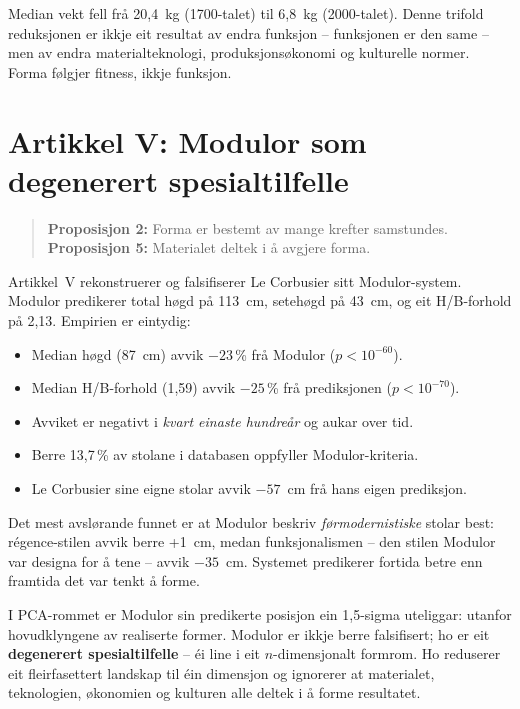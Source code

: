 \documentclass[12pt,a4paper,oneside]{report}
\begin{document}
Median vekt fell frå 20,4~kg (1700-talet) til 6,8~kg (2000-talet). Denne trifold reduksjonen er ikkje eit resultat av endra funksjon -- funksjonen er den same -- men av endra materialteknologi, produksjonsøkonomi og kulturelle normer. Forma følgjer fitness, ikkje funksjon.

\section{Artikkel V: Modulor som degenerert spesialtilfelle}
\label{sec:art5}

\begin{quote}
\textbf{Proposisjon 2:} Forma er bestemt av mange krefter samstundes.\\
\textbf{Proposisjon 5:} Materialet deltek i å avgjere forma.
\end{quote}

Artikkel~V rekonstruerer og falsifiserer Le Corbusier sitt Modulor-system. Modulor predikerer total høgd på 113~cm, setehøgd på 43~cm, og eit H/B-forhold på 2,13. Empirien er eintydig:

\begin{itemize}
  \item Median høgd (87~cm) avvik $-23$\,\% frå Modulor ($p < 10^{-60}$).
  \item Median H/B-forhold (1,59) avvik $-25$\,\% frå prediksjonen ($p < 10^{-70}$).
  \item Avviket er negativt i \emph{kvart einaste hundreår} og aukar over tid.
  \item Berre 13,7\,\% av stolane i databasen oppfyller Modulor-kriteria.
  \item Le Corbusier sine eigne stolar avvik $-57$~cm frå hans eigen prediksjon.
\end{itemize}

Det mest avslørande funnet er at Modulor beskriv \emph{førmodernistiske} stolar best: régence-stilen avvik berre +1~cm, medan funksjonalismen -- den stilen Modulor var designa for å tene -- avvik $-35$~cm. Systemet predikerer fortida betre enn framtida det var tenkt å forme.

I PCA-rommet er Modulor sin predikerte posisjon ein 1,5-sigma uteliggar: utanfor hovudklyngene av realiserte former. Modulor er ikkje berre falsifisert; ho er eit \textbf{degenerert spesialtilfelle} -- éi line i eit $n$-dimensjonalt formrom. Ho reduserer eit fleirfasettert landskap til éin dimensjon og ignorerer at materialet, teknologien, økonomien og kulturen alle deltek i å forme resultatet.
\end{document}
